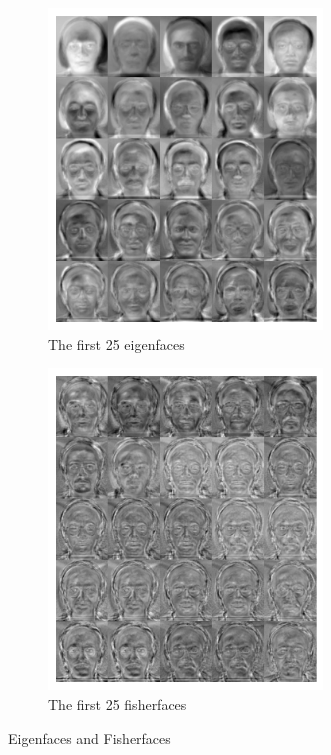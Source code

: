 \documentclass{homework}
\begin{document}
\begin{figure}[H]
    \centering
    \begin{subfigure}{0.4\textwidth}
        \centering
        \includegraphics[width=0.8\textwidth]{figures/eigenfaces.png}
        \caption{The first 25 eigenfaces}
    \end{subfigure}
    \begin{subfigure}{0.4\textwidth}
        \centering
        \includegraphics[width=0.8\textwidth]{figures/fisherfaces.png}
        \caption{The first 25 fisherfaces}
    \end{subfigure}
    \caption{Eigenfaces and Fisherfaces}
\end{figure}
\end{document}
